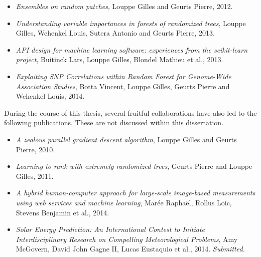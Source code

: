 \begin{itemize}
\item \citep{louppe:2012} \textit{Ensembles on random patches}, Louppe Gilles and Geurts Pierre, 2012.

\item \citep{louppe:2013} \textit{Understanding variable importances in forests of randomized trees}, Louppe Gilles, Wehenkel Louis, Sutera Antonio and Geurts Pierre, 2013.

\item \citep{buitinck:2013} \textit{API design for machine learning software: experiences from the scikit-learn project}, Buitinck Lars, Louppe Gilles, Blondel Mathieu et al., 2013.
\item \citep{botta:2014} \textit{Exploiting SNP Correlations within Random Forest for Genome-Wide Association Studies}, Botta Vincent, Louppe Gilles, Geurts Pierre and Wehenkel Louis, 2014.
\end{itemize}

During the course of this thesis, several fruitful collaborations have also
led to the following publications. These are not discussed within
this dissertation.

\begin{itemize}

\item \citep{louppe:2010} \textit{A zealous parallel gradient descent algorithm}, Louppe Gilles and Geurts Pierre, 2010.

\item \citep{geurts:2011} \textit{Learning to rank with extremely randomized trees}, Geurts Pierre and Louppe Gilles, 2011.

\item \citep{maree:2014} \textit{A hybrid human-computer approach for large-scale image-based measurements using web services and machine learning}, Mar{\'e}e Rapha{\"e}l, Rollus Loic, Stevens Benjamin et al., 2014.

\item \citep{amy:2014} \textit{Solar Energy Prediction: An International Contest to Initiate Interdisciplinary Research on Compelling Meteorological Problems}, Amy McGovern, David John Gagne II, Lucas Eustaquio et al., 2014. \textit{Submitted.}

\end{itemize}
